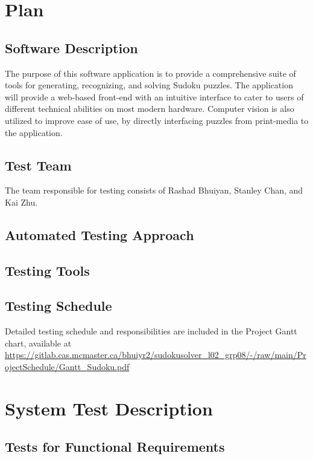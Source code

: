 \documentclass[11pt]{article}
\begin{document}
\newpage

\section{Plan}
	
\subsection{Software Description}
The purpose of this software application is to provide a comprehensive suite of tools for generating, recognizing, and solving Sudoku puzzles. The application will provide a web-based front-end with an intuitive interface to cater to users of different technical abilities on most modern hardware. Computer vision is also utilized to improve ease of use, by directly interfacing puzzles from print-media to the application.

\subsection{Test Team}
The team responsible for testing consists of Rashad Bhuiyan, Stanley Chan, and Kai Zhu.

\subsection{Automated Testing Approach}

\subsection{Testing Tools}

\subsection{Testing Schedule}
		
Detailed testing schedule and responsibilities are included in the Project Gantt chart, available at  \url{https://gitlab.cas.mcmaster.ca/bhuiyr2/sudokusolver_l02_grp08/-/raw/main/ProjectSchedule/Gantt_Sudoku.pdf}

\newpage

\section{System Test Description}
	
\subsection{Tests for Functional Requirements}
\end{document}
